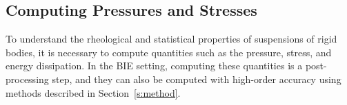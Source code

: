 \documentclass[preprint, 10pt]{elsarticle}
\begin{document}

\subsection{Computing Pressures and Stresses}
To understand the rheological and statistical properties of suspensions
of rigid bodies, it is necessary to compute quantities such as the
pressure, stress, and energy dissipation.  In the BIE setting, computing
these quantities is a post-processing step, and they can also be
computed with high-order accuracy using methods described in
Section~\ref{s:method}.
\end{document}
